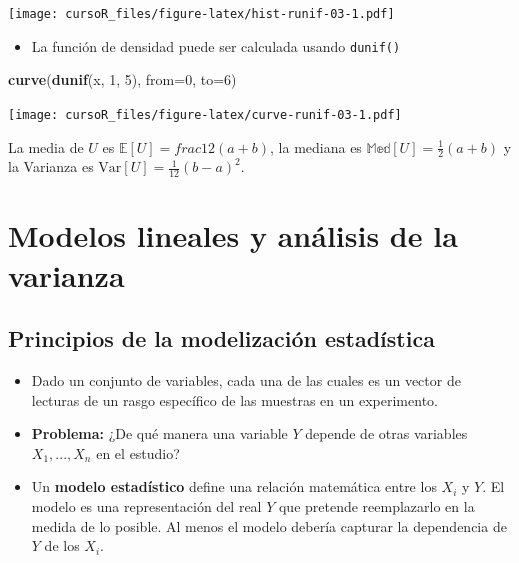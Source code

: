 \documentclass[]{book}
\newenvironment{Shaded}{\begin{snugshade}}{\end{snugshade}}
\newcommand{\KeywordTok}[1]{\textcolor[rgb]{0.13,0.29,0.53}{\textbf{#1}}}
\newcommand{\DataTypeTok}[1]{\textcolor[rgb]{0.13,0.29,0.53}{#1}}
\newcommand{\DecValTok}[1]{\textcolor[rgb]{0.00,0.00,0.81}{#1}}
\newcommand{\NormalTok}[1]{#1}
\providecommand{\tightlist}{%
  \setlength{\itemsep}{0pt}\setlength{\parskip}{0pt}}
\begin{document}
\texttt{[image: cursoR\_files/figure-latex/hist-runif-03-1.pdf]}

\begin{itemize}
\tightlist
\item
  La función de densidad puede ser calculada usando \texttt{dunif()}
\end{itemize}

\begin{Shaded}
\begin{Highlighting}[]
\KeywordTok{curve}\NormalTok{(}\KeywordTok{dunif}\NormalTok{(x, }\DecValTok{1}\NormalTok{, }\DecValTok{5}\NormalTok{), }\DataTypeTok{from=}\DecValTok{0}\NormalTok{, }\DataTypeTok{to=}\DecValTok{6}\NormalTok{)}
\end{Highlighting}
\end{Shaded}

\texttt{[image: cursoR\_files/figure-latex/curve-runif-03-1.pdf]}

La media de \(U\) es \(\mathbb{E}[U]=frac{1}{2}(a+b)\), la mediana es
\(\mathbb{Med}[U]=\frac{1}{2}(a+b)\) y la Varianza es
\(\mbox{Var}[U]=\frac{1}{12}(b-a)^2\).

\chapter{Modelos lineales y análisis de la
varianza}\label{modelos-lineales-y-anuxe1lisis-de-la-varianza}

\section{Principios de la modelización
estadística}\label{principios-de-la-modelizaciuxf3n-estaduxedstica}

\begin{itemize}
\item
  Dado un conjunto de variables, cada una de las cuales es un vector de
  lecturas de un rasgo específico de las muestras en un experimento.
\item
  \textbf{Problema:} ¿De qué manera una variable \(Y\) depende de otras
  variables \(X_1,...,X_n\) en el estudio?
\item
  Un \textbf{modelo estadístico} define una relación matemática entre
  los \(X_i\) y \(Y\). El modelo es una representación del real \(Y\)
  que pretende reemplazarlo en la medida de lo posible. Al menos el
  modelo debería capturar la dependencia de \(Y\) de los \(X_i\).
\end{itemize}
\end{document}
